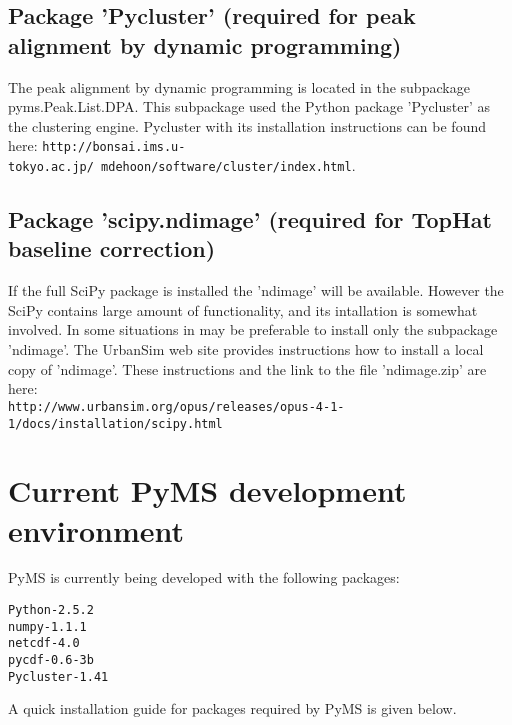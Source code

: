 \subsection{\label{subsec:pycluster}Package 'Pycluster' (required for peak
alignment by dynamic programming)}

The peak alignment by dynamic programming is located in the subpackage
pyms.Peak.List.DPA. This subpackage used the Python package 'Pycluster'
as the clustering engine. Pycluster with its installation instructions
can be found here:
{\tt http://bonsai.ims.u-tokyo.ac.jp/~mdehoon/software/cluster/index.html}.

\subsection{\label{subsec:scipy-ndmage}Package 'scipy.ndimage' (required
for TopHat baseline correction)}

If the full SciPy package is installed the 'ndimage' will be available. However
the SciPy contains large amount of functionality, and its intallation is
somewhat involved. In some situations in may be preferable to install only
the subpackage 'ndimage'. The UrbanSim web site \cite{urbansim} provides
instructions how to install a local copy of 'ndimage'. These instructions
and the link to the file 'ndimage.zip' are here:\\
{\tt http://www.urbansim.org/opus/releases/opus-4-1-1/docs/installation/scipy.html}

\section{Current PyMS development environment}

PyMS is currently being developed with the following packages:

\begin{verbatim}
Python-2.5.2
numpy-1.1.1
netcdf-4.0
pycdf-0.6-3b
Pycluster-1.41
\end{verbatim}

A quick installation guide for packages required by PyMS is given below.

